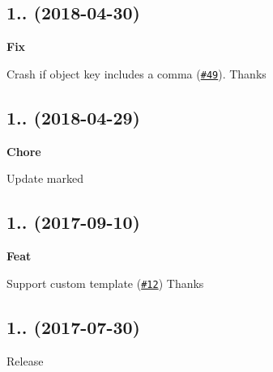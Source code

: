 \subsection*{1.. (2018-\/04-\/30)}


\begin{DoxyItemize}
\item {\bfseries Fix}
\begin{DoxyItemize}
\item Crash if object key includes a comma (\href{https://github.com/esdoc/esdoc-plugins/pull/49}{\tt \#49}). Thanks \href{https://github.com/josephschmitt}{\tt }
\end{DoxyItemize}
\end{DoxyItemize}

\subsection*{1.. (2018-\/04-\/29)}


\begin{DoxyItemize}
\item {\bfseries Chore}
\begin{DoxyItemize}
\item Update {\ttfamily marked}
\end{DoxyItemize}
\end{DoxyItemize}

\subsection*{1.. (2017-\/09-\/10)}


\begin{DoxyItemize}
\item {\bfseries Feat}
\begin{DoxyItemize}
\item Support custom template (\href{https://github.com/esdoc/esdoc-plugins/pull/12}{\tt \#12}) Thanks \href{https://github.com/andersevenrud}{\tt }
\end{DoxyItemize}
\end{DoxyItemize}

\subsection*{1.. (2017-\/07-\/30)}


\begin{DoxyItemize}
\item Release 
\end{DoxyItemize}